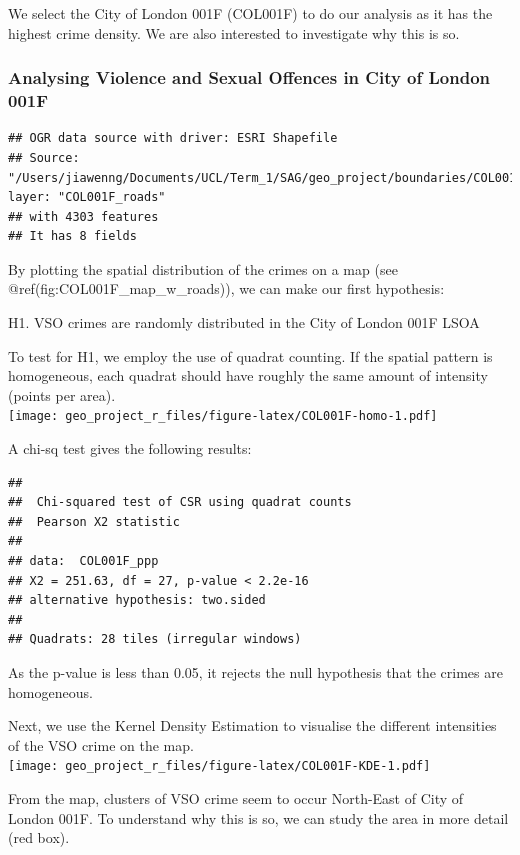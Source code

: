 \documentclass[]{article}
\begin{document}
We select the City of London 001F (COL001F) to do our analysis as it has
the highest crime density. We are also interested to investigate why
this is so.

\subsubsection{Analysing Violence and Sexual Offences in City of London
001F}\label{analysing-violence-and-sexual-offences-in-city-of-london-001f}

\begin{verbatim}
## OGR data source with driver: ESRI Shapefile 
## Source: "/Users/jiawenng/Documents/UCL/Term_1/SAG/geo_project/boundaries/COL001F_roads/COL001F_roads.shp", layer: "COL001F_roads"
## with 4303 features
## It has 8 fields
\end{verbatim}

By plotting the spatial distribution of the crimes on a map (see
@ref(fig:COL001F\_map\_w\_roads)), we can make our first hypothesis:

H1. VSO crimes are randomly distributed in the City of London 001F LSOA

To test for H1, we employ the use of quadrat counting. If the spatial
pattern is homogeneous, each quadrat should have roughly the same amount
of intensity (points per area).\\
\texttt{[image: geo\_project\_r\_files/figure-latex/COL001F-homo-1.pdf]}

A chi-sq test gives the following results:

\begin{verbatim}
## 
##  Chi-squared test of CSR using quadrat counts
##  Pearson X2 statistic
## 
## data:  COL001F_ppp
## X2 = 251.63, df = 27, p-value < 2.2e-16
## alternative hypothesis: two.sided
## 
## Quadrats: 28 tiles (irregular windows)
\end{verbatim}

As the p-value is less than 0.05, it rejects the null hypothesis that
the crimes are homogeneous.

Next, we use the Kernel Density Estimation to visualise the different
intensities of the VSO crime on the map.\\
\texttt{[image: geo\_project\_r\_files/figure-latex/COL001F-KDE-1.pdf]}

From the map, clusters of VSO crime seem to occur North-East of City of
London 001F. To understand why this is so, we can study the area in more
detail (red box).
\end{document}
